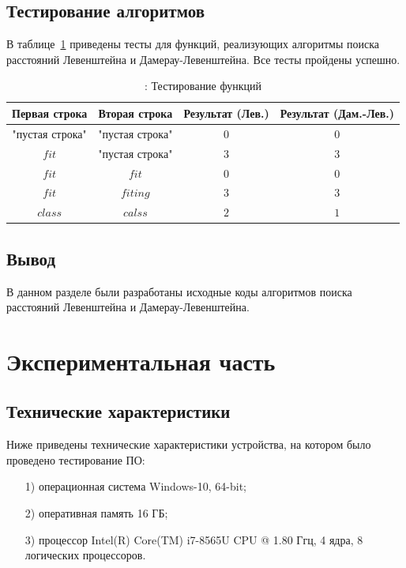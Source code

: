 \documentclass[12pt]{report}
\begin{document}
	\section{Тестирование алгоритмов}

	В таблице~\ref{tbl:test} приведены тесты для функций, реализующих алгоритмы поиска расстояний Левенштейна и Дамерау-Левенштейна. Все тесты пройдены успешно.
	
	\begin{table}[h!]
		\begin{center}
			\caption{\label{tbl:test}: Тестирование функций}
			\begin{tabular}{|c|c|c|c|}
				\hline
				Первая строка & Вторая строка & Результат (Лев.) & Результат (Дам.-Лев.) \\ 
				\hline
				"пустая строка" & "пустая строка" & $0$ & $0$\\\hline
				$fit$  & "пустая строка" & $3$ & $3$\\\hline
				$fit$  & $fit$  & $0$ & $0$\\\hline
				$fit$  & $fiting$  & $3$ & $3$\\\hline
				$class$ & $calss$ & $2$ & $1$\\\hline
				
			\end{tabular}			
		\end{center}
	\end{table}

	\section*{Вывод}
	
	В данном разделе были разработаны исходные коды алгоритмов поиска расстояний Левенштейна и Дамерау-Левенштейна.
	
	\chapter{Экспериментальная часть}
	
	\section{Технические характеристики}
	
	Ниже приведены технические характеристики устройства, на котором было проведено тестирование ПО:
	
	\begin{enumerate}
		\item[1)] операционная система Windows-10, 64-bit;
		\item[2)] оперативная память 16 ГБ;
		\item[3)] процессор Intel(R) Core(TM) i7-8565U CPU @ 1.80 Ггц, 4 ядра, 8 логических процессоров.
	\end{enumerate}
	
\end{document}
